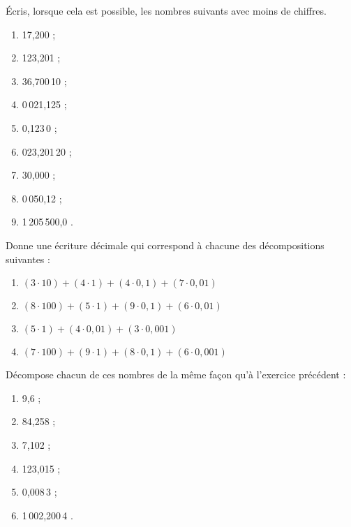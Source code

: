 \begin{exercice}
Écris, lorsque cela est possible, les nombres suivants avec moins de chiffres.
\begin{enumerate} 
 \item 17,200 \dotfill ; 
 
 \item 123,201 \dotfill ; 
  
 \item 36,700\,10 \dotfill ; 
 
 \item 0\,021,125 \dotfill ; 
 
 \item 0,123\,0 \dotfill ; 
 
 \item 023,201\,20 \dotfill ; 
 
 \item 30,000 \dotfill ; 
 
 \item 0\,050,12 \dotfill ; 
 
 \item 1\,205\,500,0 \dotfill. 
  
 \end{enumerate}
\end{exercice}


\begin{exercice}[Décomposition]
Donne une écriture décimale qui correspond à chacune des décompositions suivantes :
\begin{enumerate}
 \item $(3 \cdot 10) + (4 \cdot 1) + (4 \cdot 0,1) + (7 \cdot 0,01)$
 \item $(8 \cdot 100) + (5 \cdot 1) + (9 \cdot 0,1) + (6 \cdot 0,01)$
 \item $(5 \cdot 1) + (4 \cdot 0,01) + (3 \cdot 0,001)$
 \item $(7 \cdot 100) + (9 \cdot 1) + (8 \cdot 0,1) + (6 \cdot 0,001)$
 \end{enumerate}
\end{exercice}


\begin{exercice}
Décompose chacun de ces nombres de la même façon qu'à l'exercice précédent :
\begin{enumerate} 
 \item 9,6 \dotfill ; 
 
 \item 84,258 \dotfill ; 
 
 \item 7,102 \dotfill ;
 
 \item 123,015 \dotfill ; 
 
 \item 0,008\,3 \dotfill ; 
 
 \item 1\,002,200\,4 \dotfill.
 
 \end{enumerate}
\end{exercice}


